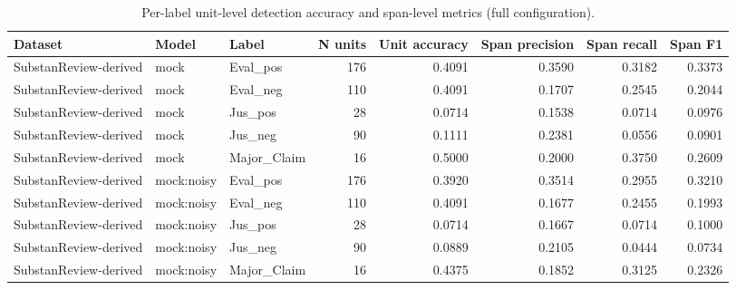\begin{table}
\caption{Per-label unit-level detection accuracy and span-level metrics (full configuration).}
\label{tab:table_per_label}
\begin{tabular}{lllrrrrr}
\toprule
Dataset & Model & Label & N units & Unit accuracy & Span precision & Span recall & Span F1 \\
\midrule
SubstanReview-derived & mock & Eval\_pos & 176 & 0.4091 & 0.3590 & 0.3182 & 0.3373 \\
SubstanReview-derived & mock & Eval\_neg & 110 & 0.4091 & 0.1707 & 0.2545 & 0.2044 \\
SubstanReview-derived & mock & Jus\_pos & 28 & 0.0714 & 0.1538 & 0.0714 & 0.0976 \\
SubstanReview-derived & mock & Jus\_neg & 90 & 0.1111 & 0.2381 & 0.0556 & 0.0901 \\
SubstanReview-derived & mock & Major\_Claim & 16 & 0.5000 & 0.2000 & 0.3750 & 0.2609 \\
SubstanReview-derived & mock:noisy & Eval\_pos & 176 & 0.3920 & 0.3514 & 0.2955 & 0.3210 \\
SubstanReview-derived & mock:noisy & Eval\_neg & 110 & 0.4091 & 0.1677 & 0.2455 & 0.1993 \\
SubstanReview-derived & mock:noisy & Jus\_pos & 28 & 0.0714 & 0.1667 & 0.0714 & 0.1000 \\
SubstanReview-derived & mock:noisy & Jus\_neg & 90 & 0.0889 & 0.2105 & 0.0444 & 0.0734 \\
SubstanReview-derived & mock:noisy & Major\_Claim & 16 & 0.4375 & 0.1852 & 0.3125 & 0.2326 \\
\bottomrule
\end{tabular}
\end{table}
